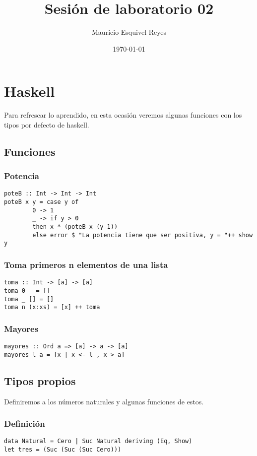 \documentclass[11pt]{article}
\author{Mauricio Esquivel Reyes}
\date{\today}
\title{Sesión de laboratorio 02}
\begin{document}
\maketitle
\tableofcontents

\section{Haskell}
\label{sec:org3a96a0d}
Para refrescar lo aprendido, en esta ocasión veremos algunas funciones con los
tipos por defecto de haskell.
\subsection{Funciones}
\label{sec:org64f6fb5}
\subsubsection{Potencia}
\label{sec:org895604b}
\begin{verbatim}
poteB :: Int -> Int -> Int
poteB x y = case y of 
        0 -> 1
        _ -> if y > 0 
        then x * (poteB x (y-1))
        else error $ "La potencia tiene que ser positiva, y = "++ show y
\end{verbatim}
\subsubsection{Toma primeros n elementos de una lista}
\label{sec:org2fa748d}
\begin{verbatim}
toma :: Int -> [a] -> [a]
toma 0 _ = []
toma _ [] = []
toma n (x:xs) = [x] ++ toma  
\end{verbatim}
\subsubsection{Mayores}
\label{sec:orga131e61}
\begin{verbatim}
mayores :: Ord a => [a] -> a -> [a]
mayores l a = [x | x <- l , x > a]
\end{verbatim}
\subsection{Tipos propios}
\label{sec:org3fd828f}
Definiremos a los números naturales y algunas funciones de estos.
\subsubsection{Definición}
\label{sec:org4d69e5c}
\begin{verbatim}
data Natural = Cero | Suc Natural deriving (Eq, Show)
let tres = (Suc (Suc (Suc Cero)))
\end{verbatim}
\end{document}
